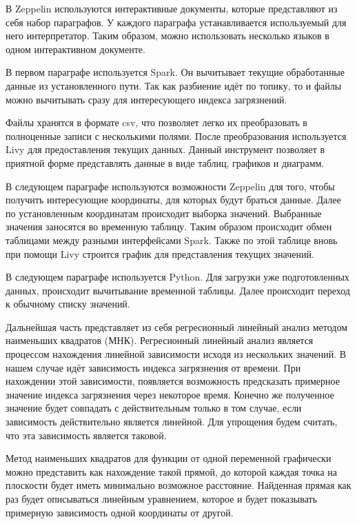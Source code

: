В Zeppelin используются интерактивные документы, которые представляют из себя набор параграфов.
У каждого параграфа устанавливается используемый для него интерпретатор.
Таким образом, можно использовать несколько языков в одном интерактивном документе.

В первом параграфе используется Spark. 
Он вычитывает текущие обработанные данные из установленного пути.
Так как разбиение идёт по топику, то и файлы можно вычитывать сразу для интересующего индекса загрязнений.

Файлы хранятся в формате csv, что позволяет легко их преобразовать в полноценные записи с несколькими полями.
После преобразования используется Livy для предоставления текущих данных.
Данный инструмент позволяет в приятной форме представлять данные в виде таблиц, графиков и диаграмм.

В следующем параграфе используются возможности Zeppelin для того, чтобы получить интересующие координаты, для которых будут браться данные.
Далее по установленным координатам происходит выборка значений.
Выбранные значения заносятся во временную таблицу.
Таким образом происходит обмен таблицами между разными интерфейсами Spark.
Также по этой таблице вновь при помощи Livy строится график для представления текущих значений.

В следующем параграфе используется Python.
Для загрузки уже подготовленных данных, происходит вычитывание временной таблицы.
Далее происходит переход к обычному списку значений.

Дальнейшая часть представляет из себя регресионный линейный анализ методом наименьших квадратов (МНК).
Регресионный линейный анализ является процессом нахождения линейной зависимости исходя из нескольких значений.
В нашем случае идёт зависимость индекса загрязнения от времени.
При нахождении этой зависимости, появляется возможность предсказать примерное значение индекса загрязнения через некоторое время.
Конечно же полученное значение будет совпадать с действительным только в том случае, если зависимость действительно является линейной.
Для упрощения будем считать, что эта зависимость является таковой.

Метод наименьших квадратов для функции от одной переменной графически можно представить как нахождение такой прямой, до которой каждая точка на плоскости будет иметь минимально возможное расстояние.
Найденная прямая как раз будет описываться линейным уравнением, которое и будет показывать примерную зависимость одной координаты от другой.

